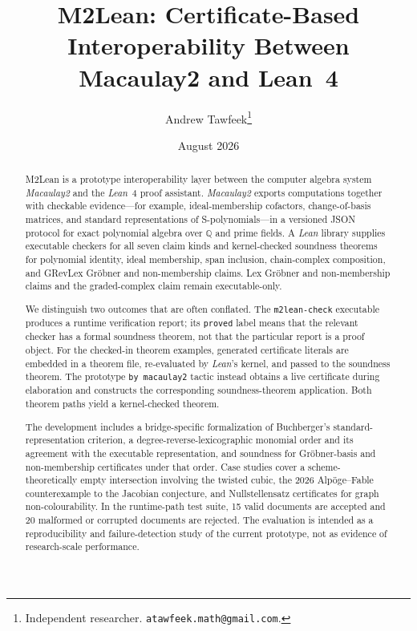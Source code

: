 \documentclass[11pt]{article}
\title{\textbf{M2Lean: Certificate-Based Interoperability Between\\ Macaulay2 and Lean~4}}
\author{Andrew Tawfeek\thanks{Independent researcher.
\texttt{atawfeek.math@gmail.com}.}}
\date{August 2026}
\newcommand{\M}{\textit{Macaulay2}}
\newcommand{\lean}{\textit{Lean}}
\newcommand{\QQ}{\mathbb{Q}}
\newcommand{\code}[1]{\texttt{#1}}
\begin{document}
\maketitle

\begin{abstract}
M2Lean is a prototype interoperability layer between the computer
algebra system \M{} and the \lean{}~4 proof assistant.  \M{} exports
computations together with checkable evidence---for example,
ideal-membership cofactors, change-of-basis matrices, and standard
representations of S-polynomials---in a versioned JSON protocol for
exact polynomial algebra over $\QQ$ and prime fields.  A \lean{}
library supplies executable checkers for all seven claim kinds and
kernel-checked soundness theorems for polynomial identity, ideal
membership, span inclusion, chain-complex composition, and GRevLex
Gr\"obner and non-membership claims.  Lex Gr\"obner and non-membership
claims and the graded-complex claim remain executable-only.

We distinguish two outcomes that are often conflated.  The
\code{m2lean-check} executable produces a runtime verification report;
its \code{proved} label means that the relevant checker has a formal
soundness theorem, not that the particular report is a proof object.
For the checked-in theorem examples, generated certificate literals are
embedded in a theorem file, re-evaluated by \lean{}'s kernel, and passed
to the soundness theorem.  The prototype \code{by macaulay2} tactic
instead obtains a live certificate during elaboration and constructs the
corresponding soundness-theorem application.  Both theorem paths yield a
kernel-checked theorem.

The development includes a bridge-specific formalization of
Buchberger's standard-representation criterion, a
degree-reverse-lexicographic monomial order and its agreement with the
executable representation, and soundness for Gr\"obner-basis and
non-membership certificates under that order.  Case studies cover a
scheme-theoretically empty intersection involving the twisted cubic,
the 2026 Alp\"oge--Fable counterexample to the Jacobian conjecture, and
Nullstellensatz certificates for graph non-colourability.  In the
runtime-path test suite, 15 valid documents are accepted and 20
malformed or corrupted documents are rejected.  The evaluation is
intended as a reproducibility and failure-detection study of the
current prototype, not as evidence of research-scale performance.
\end{abstract}
\end{document}

